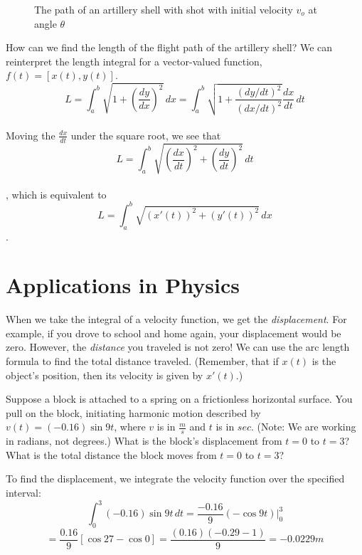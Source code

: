 \begin{figure}[htbp]
\centering
    \caption{The path of an artillery shell with shot with initial 
    velocity $v_o$ at angle $\theta$}
    \label{fig:shell}
\end{figure}  

How can we find the length of the flight path of the artillery shell? 
We can reinterpret the length integral for a vector-valued function, 
$f(t) = [x(t), y(t)]$.  
$$L = \int_a^b \sqrt{1+(\frac{dy}{dx})^2}\,dx = 
\int_a^b \sqrt{1 + \frac{(dy/dt)^2}{(dx/dt)^2}}\frac{dx}{dt}\,dt$$\\
Moving the $\frac{dx}{dt}$ under the square root, we see that
$$L = \int_a^b \sqrt{(\frac{dx}{dt})^2 + (\frac{dy}{dt})^2}\,dt$$\\,
which is equivalent to 
$$L = \int_a^b \sqrt{(x'(t))^2 + (y'(t))^2}\,dx$$.

\section{Applications in Physics}
When we take the integral of a velocity function, we get the 
\textit{displacement}. For example, if you drove to school and home 
again, your displacement would be zero. However, the \textit{distance} 
you traveled is not zero! We can use the arc length formula to find 
the total distance traveled. (Remember, that if $x(t)$ is the object's 
position, then its velocity is given by $x'(t)$.)

Suppose a block is attached to a spring on a frictionless horizontal 
surface. You pull on the block, initiating harmonic motion described 
by $v(t) = (-0.16)\sin{9t}$, where $v$ is in $\frac{m}{s}$ and $t$ is 
in $sec$. (Note: We are working in radians, not degrees.) What is the 
block's displacement from $t = 0$ to $t = 3$? What is the total 
distance the block moves from $t = 0$ to $t = 3$? 

To find the displacement, we integrate the velocity function over the 
specified interval:
$$\int_0^3 (-0.16)\sin{9t}\,dt = \frac{-0.16}{9}(-\cos{9t})|_0^3$$
$$=\frac{0.16}{9}[\cos{27} - \cos{0}] = \frac{(0.16)(-0.29 - 1)}{9} 
= -0.0229 m$$


